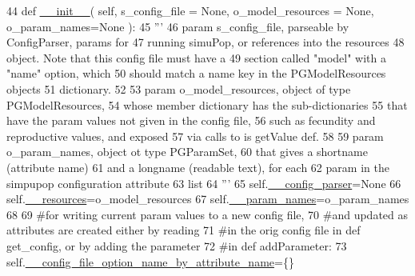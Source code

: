 \begin{DoxyCode}
44     \textcolor{keyword}{def }\hyperlink{classnegui_1_1pginputsimupop_1_1PGInputSimuPop_a1452a83a005c9d30e778b34ae67a399f}{\_\_init\_\_}( self, s\_config\_file = None, o\_model\_resources = None, o\_param\_names=None ):
45         \textcolor{stringliteral}{'''}
46 \textcolor{stringliteral}{        param s\_config\_file, parseable by ConfigParser, params for }
47 \textcolor{stringliteral}{            running simuPop, or references into the resources}
48 \textcolor{stringliteral}{            object.  Note that this config file must have a}
49 \textcolor{stringliteral}{            section called "model" with a "name" option, which}
50 \textcolor{stringliteral}{            should match a name key in the PGModelResources objects}
51 \textcolor{stringliteral}{            dictionary.}
52 \textcolor{stringliteral}{}
53 \textcolor{stringliteral}{        param o\_model\_resources, object of type PGModelResources,}
54 \textcolor{stringliteral}{            whose member dictionary has the sub-dictionaries}
55 \textcolor{stringliteral}{            that have the param values not given in the config file,}
56 \textcolor{stringliteral}{            such as fecundity and reproductive values, and exposed}
57 \textcolor{stringliteral}{            via calls to is getValue def.}
58 \textcolor{stringliteral}{}
59 \textcolor{stringliteral}{        param o\_param\_names, object ot type PGParamSet,}
60 \textcolor{stringliteral}{            that gives a shortname (attribute name)}
61 \textcolor{stringliteral}{            and a longname (readable text), for each }
62 \textcolor{stringliteral}{            param in the simpupop configuration attribute }
63 \textcolor{stringliteral}{            list}
64 \textcolor{stringliteral}{        '''}
65         self.\hyperlink{classnegui_1_1pginputsimupop_1_1PGInputSimuPop_af6628ecaa63a594fc96d1b9273fd1fd6}{\_\_config\_parser}=\textcolor{keywordtype}{None}
66         self.\hyperlink{classnegui_1_1pginputsimupop_1_1PGInputSimuPop_a6c00be5e58b61b239273e04c671cd9e8}{\_\_resources}=o\_model\_resources
67         self.\hyperlink{classnegui_1_1pginputsimupop_1_1PGInputSimuPop_a0a737393cb4d1c66062f9403296c7f19}{\_\_param\_names}=o\_param\_names
68 
69         \textcolor{comment}{#for writing current param values to a new config file,}
70         \textcolor{comment}{#and updated as attributes are created either by reading}
71         \textcolor{comment}{#in the orig config file in def get\_config, or by adding the parameter}
72         \textcolor{comment}{#in def addParameter:}
73         self.\hyperlink{classnegui_1_1pginputsimupop_1_1PGInputSimuPop_a893ab501191e9e1ed89f4f878310d97b}{\_\_config\_file\_option\_name\_by\_attribute\_name}=\{\}      

\end{DoxyCode}
